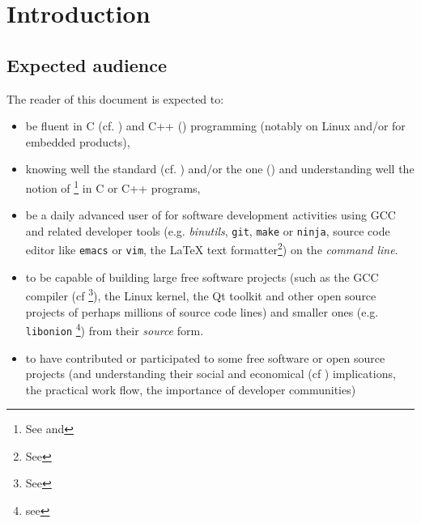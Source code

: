 \section{Introduction}


\subsection{Expected audience}

The reader of this document is expected to:
\begin{itemize}

  \item be fluent in C (cf. \cite{Kernighan:1988:CPL}) and C++
    (\cite{Stroustrup:2014:CplusPlus}) programming (notably on Linux
    and/or for embedded products),

  \item knowing well the  standard
    (cf. \cite{C11:std,Memarian:2016:PLDI}) and/or the  one
    (\cite{CplusPlus11:std}) and understanding well the notion of
     \footnote{See
      and } in C or C++
    programs,

  \item be a daily advanced user of  for software development
    activities using GCC and related developer tools
    (e.g. \textit{binutils}, \texttt{git}, \texttt{make} or
    \texttt{ninja}, source code editor like \texttt{emacs} or
    \texttt{vim}, the {\LaTeX} text formatter\footnote{See
      }) on the \emph{command
      line}.


\item to be capable of building large free software projects (such as
  the GCC compiler (cf \cite{gcc-internals} \footnote{See
    }), the Linux kernel, the Qt toolkit and
  other open source projects of perhaps millions of source code lines)
  and smaller ones (e.g. \texttt{libonion} \footnote{see
    }) from their \emph{source}
  form.

\item to have contributed or participated to some free software or
  open source projects (and understanding their social and economical
  (cf \cite{Weber:2004:SuccessOpenSource}) implications, the practical work
  flow, the importance of developer communities)
  

\end{itemize}
